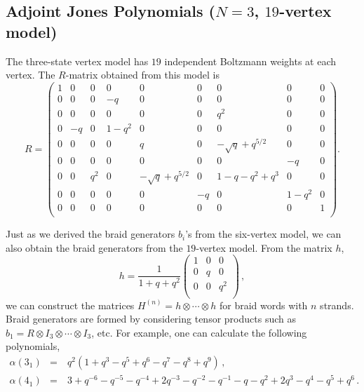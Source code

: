\documentclass[11pt]{article}
\begin{document}
\subsection{Adjoint Jones Polynomials ($N=3$, $19$-vertex model)}

The three-state vertex model has $19$ independent Boltzmann weights at each vertex.  The $R$-matrix obtained from this model is
\begin{equation}
	R =\left(
	\begin{array}{ccccccccc}
	 1 & 0 & 0 & 0 & 0 & 0 & 0 & 0 & 0 \\
	 0 & 0 & 0 & -q & 0 & 0 & 0 & 0 & 0 \\
	 0 & 0 & 0 & 0 & 0 & 0 & q^2 & 0 & 0 \\
	 0 & -q & 0 & 1-q^2 & 0 & 0 & 0 & 0 & 0 \\
	 0 & 0 & 0 & 0 & q & 0 & -\sqrt{q}+q^{5/2} & 0 & 0 \\
	 0 & 0 & 0 & 0 & 0 & 0 & 0 & -q & 0 \\
	 0 & 0 & q^2 & 0 & -\sqrt{q}+q^{5/2} & 0 & 1-q-q^2+q^3 & 0 & 0 \\
	 0 & 0 & 0 & 0 & 0 & -q & 0 & 1-q^2 & 0 \\
	 0 & 0 & 0 & 0 & 0 & 0 & 0 & 0 & 1 \\
	\end{array}
	\right).
\end{equation}

Just as we derived the braid generators \( b_i \)'s from the six-vertex model, we can also obtain the braid generators from the $19$-vertex model. From the matrix \( h \), 
\begin{equation}
	h = \frac{1}{1+q+q^2} \left( 
	\begin{array}{ccc}
	1 & 0 & 0 \\
	0 & q & 0 \\
	0 & 0 & q^2 \\
	\end{array}
	\right) \,,
\end{equation}
we can construct the matrices $H^{(n)}=h\otimes\cdots\otimes h$ for braid words with $n$ strands. Braid generators are formed by considering tensor products such as $b_1=R\otimes I_3\otimes\cdots\otimes I_3$, etc. For example, one can calculate the following polynomials,
\begin{eqnarray}
	\alpha(3_1) &=&\ q^2 (1 + q^3 - q^5 + q^6 - q^7 - q^8 + q^9)\,,\\
	\alpha(4_1) &=&\ 3+q^{-6} - q^{-5} -q^{-4} + 2q^{-3} - q^{-2} - q^{-1}- q - q^2 +  2 q^3 - q^4 - q^5 + q^6 \,. \nonumber \\
\end{eqnarray}
\end{document}
